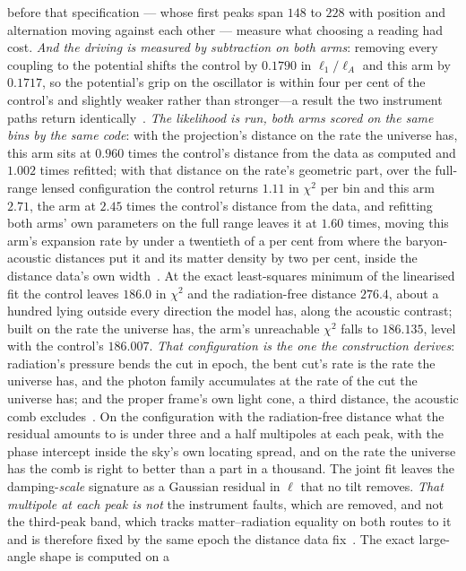 \documentclass[11pt,a4paper]{article}
\theoremstyle{plain}
\theoremstyle{definition}
\theoremstyle{remark}
\begin{document}
\begin{enumerate}
before that specification --- whose first peaks span $148$ to $228$ with position and alternation moving
against each other --- measure what choosing a reading had cost.  \emph{And the driving is measured by
subtraction on both arms}: removing every coupling to the potential shifts the control by $0.1790$ in
$\ell_1/\ell_A$ and this arm by $0.1717$, so the potential's grip on the oscillator is within four per cent of
the control's and slightly weaker rather than stronger---a result the two instrument paths return
identically~\cite{JanzenCRcosmology}.
\emph{The likelihood is run, both arms scored on the same bins by the same code}: with the projection's distance on the rate the universe has, this arm sits at $0.960$ times the control's distance from the data as computed and $1.002$ times refitted; with that distance on the rate's geometric part, over the full-range lensed configuration the control returns $1.11$ in $\chi^{2}$ per bin and this arm $2.71$, the arm at $2.45$ times the control's distance from the data, and refitting both arms' own parameters on the full range leaves it at $1.60$ times, moving this arm's expansion rate by under a twentieth of a per cent from where the baryon-acoustic distances put it and its matter density by two per cent, inside the distance data's own width~\cite{JanzenCRcosmology}. At the exact least-squares minimum of the linearised fit the control leaves $186.0$ in $\chi^{2}$ and the radiation-free distance $276.4$, about a hundred lying outside every direction the model has, along the acoustic contrast; built on the rate the universe has, the arm's unreachable $\chi^{2}$ falls to $186.135$, level with the control's $186.007$. \emph{That configuration is the one the construction derives}: radiation's pressure bends the cut in epoch, the bent cut's rate is the rate the universe has, and the photon family accumulates at the rate of the cut the universe has; and the proper frame's own light cone, a third distance, the acoustic comb excludes~\cite{JanzenCRcosmology}. On the configuration with the radiation-free distance what the residual amounts to is under three and a half multipoles at each peak, with the phase intercept inside the sky's own locating spread, and on the rate the universe has the comb is right to better than a part in a thousand. The joint fit leaves the damping-\emph{scale} signature as a Gaussian residual in $\ell$ that
no tilt removes.  \emph{That multipole at each peak is not} the instrument
faults, which are removed, and not the third-peak band, which tracks matter--radiation equality on both
routes to it and is therefore fixed by the same epoch the distance data fix~\cite{JanzenCRcosmology}.  The exact large-angle shape is computed on a

\end{enumerate}
\end{document}
